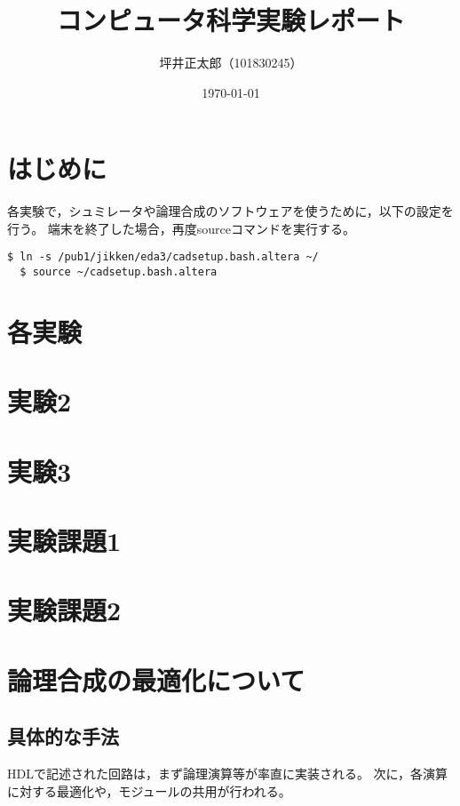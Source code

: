\documentclass[a4paper,15pt]{jsarticle}
\begin{document}
\title{コンピュータ科学実験レポート}
\author{坪井正太郎（101830245）}
\date{\today}
\maketitle

\section*{はじめに}
各実験で，シュミレータや論理合成のソフトウェアを使うために，以下の設定を行う。
端末を終了した場合，再度sourceコマンドを実行する。
\begin{lstlisting}[caption={設定の読み込み},label={設定の読み込み}]
  $ ln -s /pub1/jikken/eda3/cadsetup.bash.altera ~/
  $ source ~/cadsetup.bash.altera
\end{lstlisting}

\section*{各実験}


\section{実験2}


\section{実験3}


\section{実験課題1}


\section{実験課題2}


\section{論理合成の最適化について}
\subsection{具体的な手法}
HDLで記述された回路は，まず論理演算等が率直に実装される。
次に，各演算に対する最適化や，モジュールの共用が行われる。
\end{document}
